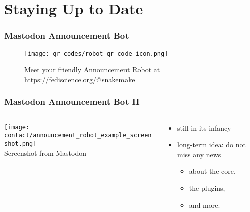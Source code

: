 \section{Staying Up to Date}
{   
}

\begin{frame}
	\frametitle{Mastodon Announcement Bot}
	\centering
	\begin{figure}
		\texttt{[image: qr\_codes/robot\_qr\_code\_icon.png]}\\
		\caption*{Meet your friendly \Snakemake Announcement Robot at \url{https://fediscience.org/@snakemake}}
	\end{figure}
\end{frame}

\begin{frame}
	\frametitle{Mastodon Announcement Bot II}
	\begin{columns}
		\begin{column}{0.5\textwidth}
			\texttt{[image: contact/announcement\_robot\_example\_screenshot.png]}\\
			Screenshot from Mastodon
		\end{column}
	    \begin{column}{0.5\textwidth}
            \begin{itemize}
            	\item still in its infancy
            	\item long-term idea: do not miss any news
            	\begin{itemize}
            		\item about the \Snakemake core,
            		\item the plugins,
            		\item and more.
            	\end{itemize}
            \end{itemize}
	    \end{column}
	\end{columns}
\end{frame}

